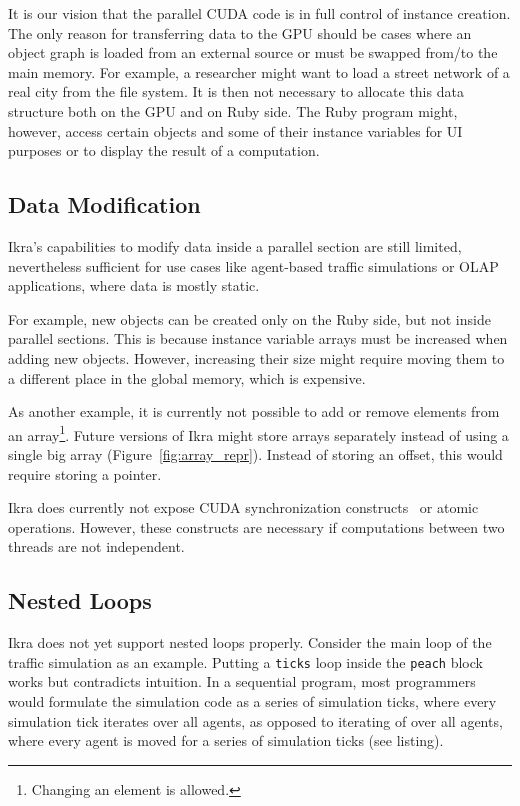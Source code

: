 \documentclass[preprint]{sigplanconf}
\begin{document}
It is our vision that the parallel CUDA code is in full control of instance creation. The only reason for transferring data to the GPU should be cases where an object graph is loaded from an external source or must be swapped from/to the main memory. For example, a researcher might want to load a street network of a real city from the file system. It is then not necessary to allocate this data structure both on the GPU and on Ruby side. The Ruby program might, however, access certain objects and some of their instance variables for UI purposes or to display the result of a computation.

\subsection{Data Modification}
\label{sec:gen_new_obj}
Ikra's capabilities to modify data inside a parallel section are still limited, nevertheless sufficient for use cases like agent-based traffic simulations or OLAP applications, where data is mostly static.

For example, new objects can be created only on the Ruby side, but not inside parallel sections. This is because instance variable arrays must be increased when adding new objects. However, increasing their size might require moving them to a different place in the global memory, which is expensive.

As another example, it is currently not possible to add or remove elements from an array\footnote{Changing an element is allowed.}. Future versions of Ikra might store arrays separately instead of using a single big array (Figure~\ref{fig:array_repr}). Instead of storing an offset, this would require storing a pointer.

Ikra does currently not expose CUDA synchronization constructs~\cite{gpusync} or atomic operations. However, these constructs are necessary if computations between two threads are not independent.


\subsection{Nested Loops}
\label{sec:nested_loops}
Ikra does not yet support nested loops properly. Consider the main loop of the traffic simulation as an example. Putting a \texttt{ticks} loop inside the \texttt{peach} block works but contradicts intuition. In a sequential program, most programmers would formulate the simulation code as a series of simulation ticks, where every simulation tick iterates over all agents, as opposed to iterating of over all agents, where every agent is moved for a series of simulation ticks (see listing).
\end{document}
